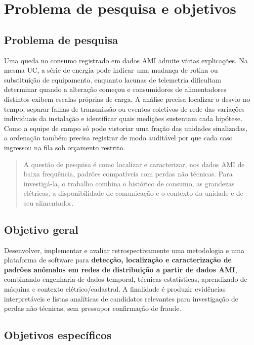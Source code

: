 \chapter{Problema de pesquisa e objetivos}\label{problema-de-pesquisa-e-objetivos}

\section{Problema de pesquisa}\label{problema-de-pesquisa}

Uma queda no consumo registrado em dados AMI admite várias explicações. Na mesma UC, a série de energia pode indicar uma mudança de rotina ou substituição de equipamento, enquanto lacunas de telemetria dificultam determinar quando a alteração começou e consumidores de alimentadores distintos exibem escalas próprias de carga. A análise precisa localizar o desvio no tempo, separar falhas de transmissão ou eventos coletivos de rede das variações individuais da instalação e identificar quais medições sustentam cada hipótese. Como a equipe de campo só pode vistoriar uma fração das unidades sinalizadas, a ordenação também precisa registrar de modo auditável por que cada caso ingressou na fila sob orçamento restrito.

\begin{quote}
A questão de pesquisa é como localizar e caracterizar, nos dados AMI de baixa frequência, padrões compatíveis com perdas não técnicas. Para investigá-la, o trabalho combina o histórico de consumo, as grandezas elétricas, a disponibilidade de comunicação e o contexto da unidade e de seu alimentador.
\end{quote}

\section{Objetivo geral}\label{objetivo-geral}

Desenvolver, implementar e avaliar retrospectivamente uma metodologia e uma plataforma de software para \textbf{detecção, localização e caracterização de padrões anômalos em redes de distribuição a partir de dados AMI}, combinando engenharia de dados temporal, técnicas estatísticas, aprendizado de máquina e contexto elétrico/cadastral. A finalidade é produzir evidências interpretáveis e listas analíticas de candidatos relevantes para investigação de perdas não técnicas, sem pressupor confirmação de fraude.

\section{Objetivos específicos}\label{objetivos-especuxedficos}

